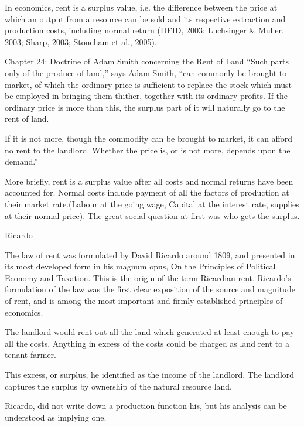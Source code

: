 In economics, rent is a surplus value, i.e. the difference between the price at which an output from a resource can be sold and its respective extraction and production costs, including normal return (DFID, 2003; Luchsinger \& M\:uller, 2003; Sharp, 2003; Stoneham et al., 2005).

Chapter 24: Doctrine of Adam Smith concerning the Rent of Land
``Such parts only of the produce of land,” says Adam Smith, ``can commonly be brought to market, of which the ordinary price is sufficient to replace the stock which must be employed in bringing them thither, together with its ordinary profits. If the ordinary price is more than this, the surplus part of it will naturally go to the rent of land.

If it is not more, though the commodity can be brought to market, it can afford no rent to the landlord. Whether the price is, or is not more, depends upon the demand.''

More briefly, rent is a surplus value after all costs and normal returns have been accounted for. Normal costs include  payment of all the factors of production at their market rate.(Labour at the going wage, Capital at the interest rate, supplies at their normal price). The great social question at first was who gets the surplus.  


Ricardo

The law of rent was formulated by David Ricardo around 1809, and presented in its most developed form in his magnum opus, On the Principles of Political Economy and Taxation. This is the origin of the term Ricardian rent. Ricardo's formulation of the law was the first clear exposition of the source and magnitude of rent, and is among the most important and firmly established principles of economics.

The landlord would rent out all the land which generated at least enough to pay all the costs. Anything in excess of the costs could be charged as land rent to a tenant farmer.

This excess, or surplus, he identified as the income of the landlord. The landlord captures the surplus by ownership of the natural resource land. 

Ricardo, did not write down a production function his, but his analysis can be understood as implying one.


